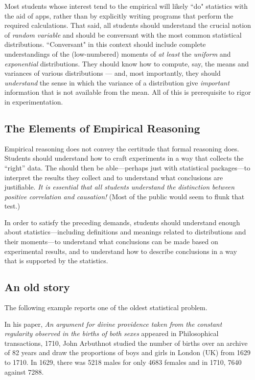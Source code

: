 Most students whose interest tend to the empirical will likely ``do"
statistics with the aid of apps, rather than by explicitly writing
programs that perform the required calculations.  That said, all
students should understand the crucial notion of {\em random variable}
and should be conversant with the most common statistical
distributions.  ``Conversant" in this context should include complete
understandings of the (low-numbered) moments of {\em at least} the
{\em uniform} and {\em exponential} distributions.  They should know
how to compute, say, the means and variances of various distributions
— and, most importantly, they should {\em understand} the sense in
which the variance of a distribution give {\em important} information
that is not available from the mean.  All of this is prerequisite to
rigor in experimentation.

\subsection{The Elements of Empirical Reasoning}

Empirical reasoning does not convey the certitude that formal
reasoning does.  Students should understand how to craft experiments
in a way that collects the ``right'' data.  The should then be
able---perhaps just with statistical packages---to interpret the
results they collect and to understand what conclusions are
justifiable.  {\em It is essential that all students understand the                  
  distinction between {\em positive correlation} and {\em causation}!}
(Most of the public would seem to flunk that test.)

In order to satisfy the preceding demands, students should understand
enough about statistics---including definitions and meanings related
to distributions and their moments---to understand what conclusions
can be made based on experimental results, and to understand how to
describe conclusions in a way that is supported by the statistics.


\subsection{An old story}

The following example reports one of the oldest statistical problem.

In his paper,
\textit{An argument for divine providence taken from the constant regularity observed in the births of both sexes}
appeared in Philosophical transactions, 1710, 
John Arbuthnot studied the number of births over an archive of 82 years and draw the proportions of boys and girls
in London (UK) from 1629 to 1710. 
In 1629, there was  5218 males for only 4683 females and in 1710, 7640 against 7288. 
 
